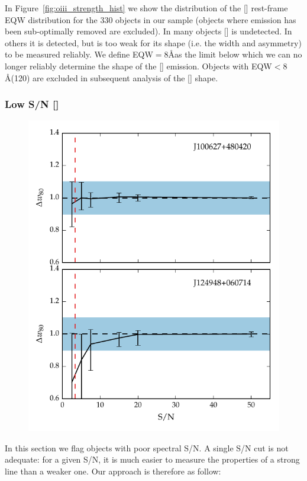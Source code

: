 In Figure~\ref{fig:oiii_strength_hist} we show the distribution of the [] rest-frame EQW distribution for the 330 objects in our sample (objects where  emission has been sub-optimally removed are excluded). 
In many objects [] is undetected. 
In others it is detected, but is too weak for its shape (i.e. the width and asymmetry) to be measured reliably. 
We define EQW$=8$\AA as the limit below which we can no longer reliably determine the shape of the [] emission. 
Objects with EQW$<8$\AA (120) are excluded in subsequent analysis of the [] shape.  

\subsubsection{Low S/N []}
 
\begin{figure}
    \centering
    \includegraphics[width=0.7\columnwidth]{figures/chapter04/snr_test.pdf} 
    \caption{}
    \label{fig:snr_test}
\end{figure}

In this section we flag objects with poor spectral S/N. 
A single S/N cut is not adequate: for a given S/N, it is much easier to measure the properties of a strong line than a weaker one. 
Our approach is therefore as follow:

